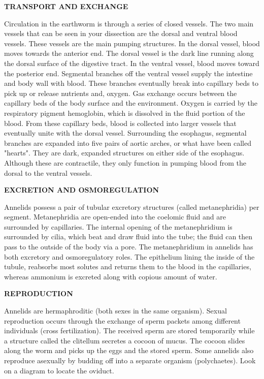 \documentclass[
]{book}
\begin{document}
\textbf{TRANSPORT AND EXCHANGE}

Circulation in the earthworm is through a series of closed vessels. The two main vessels that can
be seen in your dissection are the dorsal and ventral blood vessels. These vessels are the main
pumping structures. In the dorsal vessel, blood moves towards the anterior end. The dorsal vessel
is the dark line running along the dorsal surface of the digestive tract. In the ventral vessel, blood
moves toward the posterior end. Segmental branches off the ventral vessel supply the intestine
and body wall with blood. These branches eventually break into capillary beds to pick up or
release nutrients and, oxygen. Gas exchange occurs between the capillary beds of the body
surface and the environment. Oxygen is carried by the respiratory pigment hemoglobin, which is
dissolved in the fluid portion of the blood. From these capillary beds, blood is collected into larger
vessels that eventually unite with the dorsal vessel. Surrounding the esophagus, segmental branches are expanded into five pairs of aortic arches, or what have been called "hearts". They are dark, expanded structures on either side of the esophagus. Although these are contractile, they only function in pumping blood from the dorsal to the ventral vessels.

\textbf{EXCRETION AND OSMOREGULATION}

Annelids possess a pair of tubular excretory structures (called metanephridia) per segment.
Metanephridia are open-ended into the coelomic fluid and are surrounded by capillaries. The internal opening of the metanephridium is surrounded by cilia, which beat and draw fluid into the tube; the fluid can then pass to the outside of the body via a pore. The metanephridium in annelids has both excretory and osmoregulatory roles. The epithelium lining the inside of the tubule, reabsorbs most solutes and returns them to the blood in the capillaries, whereas ammonium is excreted along with copious amount of water.

\textbf{REPRODUCTION}

Annelids are hermaphroditic (both sexes in the same organism). Sexual reproduction occurs through the exchange of sperm packets among different individuals (cross fertilization). The received sperm are stored temporarily while a structure called the clitellum secretes a cocoon of mucus. The cocoon slides along the worm and picks up the eggs and the stored sperm. Some annelids also reproduce asexually by budding off into a separate organism (polychaetes). Look on a diagram to locate the oviduct.
\end{document}
